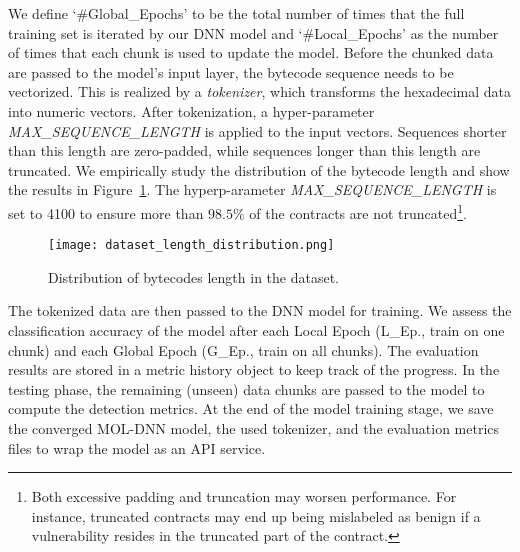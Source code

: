 We define `\#Global\_Epochs' to be the total number of times that the full training set is iterated by our DNN model and `\#Local\_Epochs' as the number of times that each chunk is used to update the model.
Before the chunked data are passed to the model's input layer, the bytecode sequence needs to be vectorized.
This is realized by a \textit{tokenizer}, which transforms the hexadecimal data into numeric vectors. 
After tokenization, a hyper-parameter \textit{MAX\_SE\-QUENCE\-\_LENGTH} is applied to the input vectors. Sequences shorter than this length are zero-padded, while sequences longer than this length are truncated. 
We empirically study the distribution of the bytecode length and show the results in Figure~\ref{fig:dataset-length-distribution}. The hyperp-arameter \textit{MAX\_SE\-QUENCE\-\_LENGTH} is set to 4100 to ensure more than $98.5\%$ of the contracts are not truncated\footnote{Both excessive padding and truncation may worsen performance. For instance, truncated contracts may end up being mislabeled as benign if a vulnerability resides in the truncated part of the contract.}.

\begin{figure}[ht!]
  \centering
  \texttt{[image: dataset\_length\_distribution.png]}
  \vspace{-1.5em}
  \caption{Distribution of bytecodes length in the dataset.}
  \label{fig:dataset-length-distribution}
  \vspace{0.8em}
\end{figure}

The tokenized data are then passed to the DNN model for training. We assess the classification accuracy of the model after each Local Epoch (L\_Ep., train on one chunk) and each Global Epoch (G\_Ep., train on all chunks). The evaluation results are stored in a metric history object to keep track of the progress.  
In the testing phase, the remaining (unseen) data chunks are passed to the model to compute the detection metrics. 
At the end of the model training stage, we save the converged MOL-DNN model, the used tokenizer, and the evaluation metrics files to wrap the model as an API service. 

\vspace{-0.3em}

